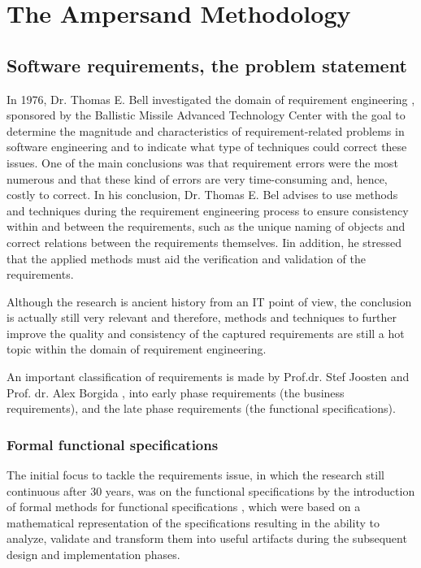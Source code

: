 
\section{The Ampersand Methodology}
\label{sec:AmpersandTheory}

\subsection{Software requirements, the problem statement}

In 1976,  Dr. Thomas E. Bell investigated the domain of requirement engineering , sponsored by the Ballistic Missile Advanced Technology Center with the goal to determine the magnitude and characteristics of requirement-related problems in software engineering and to indicate what type of techniques could correct these issues. 
One of the main conclusions was that requirement errors were the most numerous and that these kind of errors are very time-consuming and, hence, costly to correct.
In his conclusion, Dr. Thomas E. Bel advises to use methods and techniques during the requirement engineering process to ensure consistency within and  between the requirements, such as the unique naming of objects and correct relations between the requirements themselves.
Iin addition, he stressed that the applied methods must aid the verification and validation of the requirements.
 
Although the research is ancient history from an IT point of view, the conclusion is actually still very relevant and therefore, methods and techniques to further improve the quality and consistency of the captured requirements are still a hot topic within the domain of requirement engineering.

An important classification of requirements is made by  Prof.dr. Stef Joosten  and Prof. dr. Alex Borgida , into early phase requirements (the business requirements), and the late phase requirements (the functional specifications). 

\subsubsection{Formal functional specifications}
The initial focus to tackle the requirements issue, in which the research still continuous after 30 years, was on the functional specifications by the introduction of formal methods for functional specifications , which were based on a mathematical representation of the specifications resulting in the ability to analyze, validate and transform them into useful artifacts during the subsequent design and implementation phases. 

